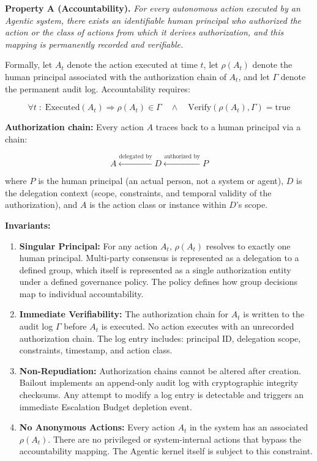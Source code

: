 \textbf{Property A (Accountability).} \emph{For every autonomous action executed by an Agentic system, there exists an identifiable human principal who authorized the action or the class of actions from which it derives authorization, and this mapping is permanently recorded and verifiable.}

Formally, let $A_t$ denote the action executed at time $t$, let $\rho(A_t)$ denote the human principal associated with the authorization chain of $A_t$, and let $\Gamma$ denote the permanent audit log. Accountability requires:

\[
\forall t \;:\; \text{Executed}(A_t) \Rightarrow \rho(A_t) \in \Gamma \quad \land \quad \text{Verify}(\rho(A_t), \Gamma) = \text{true}
\]

\textbf{Authorization chain:} Every action $A$ traces back to a human principal via a chain:

\[
A \xleftarrow{\text{delegated by}} D \xleftarrow{\text{authorized by}} P
\]

where $P$ is the human principal (an actual person, not a system or agent), $D$ is the delegation context (scope, constraints, and temporal validity of the authorization), and $A$ is the action class or instance within $D$'s scope.

\textbf{Invariants:}

\begin{enumerate}
    \item \textbf{Singular Principal:} For any action $A_t$, $\rho(A_t)$ resolves to exactly one human principal. Multi-party consensus is represented as a delegation to a defined group, which itself is represented as a single authorization entity under a defined governance policy. The policy defines how group decisions map to individual accountability.

    \item \textbf{Immediate Verifiability:} The authorization chain for $A_t$ is written to the audit log $\Gamma$ before $A_t$ is executed. No action executes with an unrecorded authorization chain. The log entry includes: principal ID, delegation scope, constraints, timestamp, and action class.

    \item \textbf{Non-Repudiation:} Authorization chains cannot be altered after creation. Bailout implements an append-only audit log with cryptographic integrity checksums. Any attempt to modify a log entry is detectable and triggers an immediate Escalation Budget depletion event.

    \item \textbf{No Anonymous Actions:} Every action $A_t$ in the system has an associated $\rho(A_t)$. There are no privileged or system-internal actions that bypass the accountability mapping. The Agentic kernel itself is subject to this constraint.
\end{enumerate}

